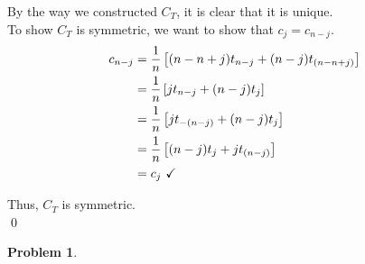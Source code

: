 \documentclass[12pt]{article}
\newtheorem{problem}{Problem}
\begin{document}
\noindent
By the way we constructed $C_T$, it is clear that it is unique.\\

\noindent
To show $C_T$ is symmetric, we want to show that $c_j = c_{n-j}$.
\begin{align}
c_{n-j} &= \frac{1}{n}\left[(n-n+j)t_{n-j} + (n-j)t_{(n-n+j)}\right] \nonumber \\
&= \frac{1}{n}\left[jt_{n-j} + (n-j)t_{j}\right] \nonumber \\
&= \frac{1}{n}\left[jt_{-(n-j)} + (n-j)t_j\right] \nonumber \\
&= \frac{1}{n}\left[(n-j)t_j + jt_{(n-j)}\right] \nonumber \\
&= c_j \text{ \checkmark} \nonumber
\end{align}

\noindent
Thus, $C_T$ is symmetric.\\
\qed


\newpage
\bigskip\bigskip
\noindent
\begin{problem}
\end{problem}
\end{document}
